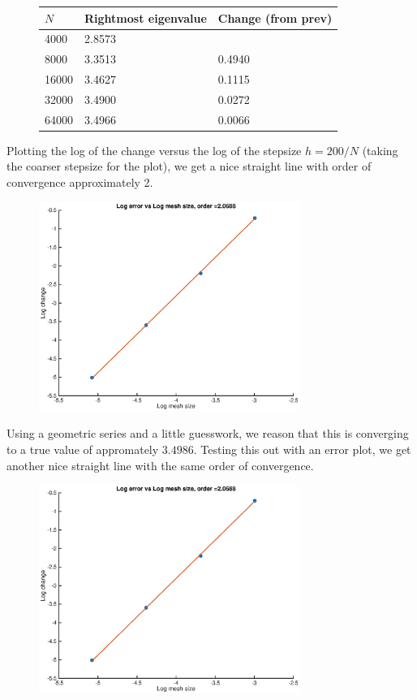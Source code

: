 \documentclass[12pt]{article}
\begin{document}
\begin{figure}[H]
\begin{tabular}{l|ll}
$N$       & Rightmost eigenvalue & Change (from prev) \\ \hline
4000      &   2.8573 &            \\
8000      &   3.3513 &   0.4940   \\
16000     &   3.4627 &   0.1115   \\
32000     &   3.4900 &   0.0272   \\
64000     &   3.4966 &   0.0066   \\       
\end{tabular}
\end{figure}
Plotting the log of the change versus the log of the stepsize $h = 200/N$ (taking the coarser stepsize for the plot), we get a nice straight line with order of convergence approximately 2.
\begin{figure}[H]
\includegraphics[width=8.5cm]{double1logplot1.eps}
\end{figure}
Using a geometric series and a little guesswork, we reason that this is converging to a true value of appromately $3.4986$. Testing this out with an error plot, we get another nice straight line with the same order of convergence.
\begin{figure}[H]
\includegraphics[width=8.5cm]{double1logplot1.eps}
\end{figure}
\end{document}
